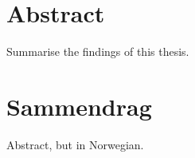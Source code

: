 \chapter*{Abstract}
Summarise the findings of this thesis.
\chapter*{Sammendrag}
Abstract, but in Norwegian.